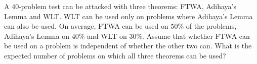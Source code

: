 A $40$-problem test can be attacked with three theorems: FTWA, Adihaya's Lemma and WLT. WLT can be used only on problems where Adihaya's Lemma can also be used. On average, FTWA can be used on $50\%$ of the problems, Adihaya's Lemma on $40\%$ and WLT on $30\%$. Assume that whether FTWA can be used on a problem is independent of whether the other two can. What is the expected number of problems on which all three theorems can be used?
